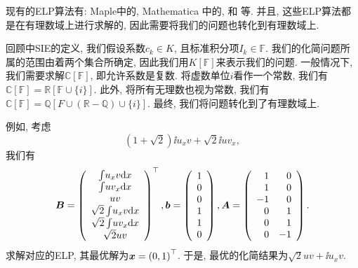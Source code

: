 现有的ELP算法有: Maple中的, Mathematica 中的,  \citep{soplex} 和  \citep{qsoptex} 等. 并且, 这些ELP算法都是在有理数域上进行求解的, 因此需要将我们的问题也转化到有理数域上. 

回顾中SIE的定义, 我们假设系数$c_k\in K$, 且标准积分项$I_k\in \mathbb F$. 我们的化简问题所属的范围由着两个集合所确定, 因此我们用$K[\mathbb F]$来表示我们的问题. 一般情况下, 我们需要求解$\mathbb C[\mathbb F]$, 即允许系数是复数. 将虚数单位$i$看作一个常数, 我们有$\mathbb C[\mathbb F]=\mathbb R[\mathbb F \cup \{i\}]$. 此外, 将所有无理数也视为常数, 我们有$\mathbb C[\mathbb F]=\mathbb Q[F\cup (\mathbb R - \mathbb Q) \cup \{i\}]$. 最终, 我们将问题转化到了有理数域上. 

\begin{example}
例如, 考虑
\begin{equation}
\left(1+\sqrt{2}\right)\ii{u_x v}+\sqrt{2}\ii{u v_x}, 
\end{equation}
我们有 
\begin{equation}
\bm{B}=\left(
\begin{array}{c}
\int\!{u_x v\mathrm{d}x}  \\
\int\!{u v_x\mathrm{d}x}  \\
u v         \\
\sqrt{2}\int\!{u_x v\mathrm{d}x}  \\
\sqrt{2}\int\!{u v_x\mathrm{d}x}  \\
\sqrt{2}u v         \\
\end{array}
\right)^\top,
\bm{b}=\left(
\begin{array}{c}
1   \\
0   \\
0   \\
1   \\
1   \\
0   \\
\end{array}
\right),
\bm{A}=\left(
\begin{array}{rr}
1   & 0\\
1   & 0\\
-1  & 0\\
0   & 1\\
0   & 1\\
0   & -1\\
\end{array}
\right).
\end{equation}
求解对应的ELP, 其最优解为$\bm{x}=\left(0,1\right)^\top$. 于是, 最优的化简结果为$\sqrt{2}uv+\ii{u_x v}$. 
\end{example}

